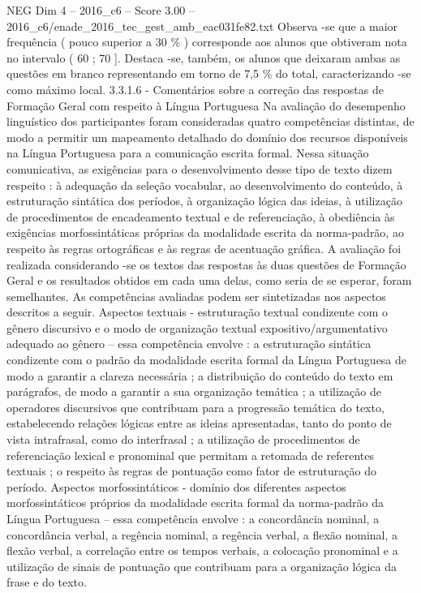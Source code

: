 \begin{textsample}{NEG Dim 4 – 2016\_c6 – Score 3.00 – 2016\_c6/enade\_2016\_tec\_gest\_amb\_eac031fe82.txt}
Observa -se que a maior frequência ( pouco superior a 30 \% ) corresponde aos alunos que obtiveram nota no intervalo ( 60 ; 70 ].
Destaca -se, também, os alunos que deixaram ambas as questões em branco representando em torno de 7,5 \% do total, caracterizando -se como máximo local. 3.3.1.6 - Comentários sobre a correção das respostas de Formação Geral com respeito à Língua Portuguesa Na avaliação do desempenho linguístico dos participantes foram consideradas quatro competências distintas, de modo a permitir um mapeamento detalhado do domínio dos recursos disponíveis na Língua Portuguesa para a comunicação escrita formal.
Nessa situação comunicativa, as exigências para o desenvolvimento desse tipo de texto dizem respeito : à adequação da seleção vocabular, ao desenvolvimento do conteúdo, à estruturação sintática dos períodos, à organização lógica das ideias, à utilização de procedimentos de encadeamento textual e de referenciação, à obediência às exigências morfossintáticas próprias da modalidade escrita da norma-padrão, ao respeito às regras ortográficas e às regras de acentuação gráfica.
A avaliação foi realizada considerando -se os textos das respostas às duas questões de Formação Geral e os resultados obtidos em cada uma delas, como seria de se esperar, foram semelhantes.
As competências avaliadas podem ser sintetizadas nos aspectos descritos a seguir.
Aspectos textuais - estruturação textual condizente com o gênero discursivo e o modo de organização textual expositivo/argumentativo adequado ao gênero – essa competência envolve : a estruturação sintática condizente com o padrão da modalidade escrita formal da Língua Portuguesa de modo a garantir a clareza necessária ; a distribuição do conteúdo do texto em parágrafos, de modo a garantir a sua organização temática ; a utilização de operadores discursivos que contribuam para a progressão temática do texto, estabelecendo relações lógicas entre as ideias apresentadas, tanto do ponto de vista intrafrasal, como do interfrasal ; a utilização de procedimentos de referenciação lexical e pronominal que permitam a retomada de referentes textuais ; o respeito às regras de pontuação como fator de estruturação do período.
Aspectos morfossintáticos - domínio dos diferentes aspectos morfossintáticos próprios da modalidade escrita formal da norma-padrão da Língua Portuguesa – essa competência envolve : a concordância nominal, a concordância verbal, a regência nominal, a regência verbal, a flexão nominal, a flexão verbal, a correlação entre os tempos verbais, a colocação pronominal e a utilização de sinais de pontuação que contribuam para a organização lógica da frase e do texto.

\end{textsample}
